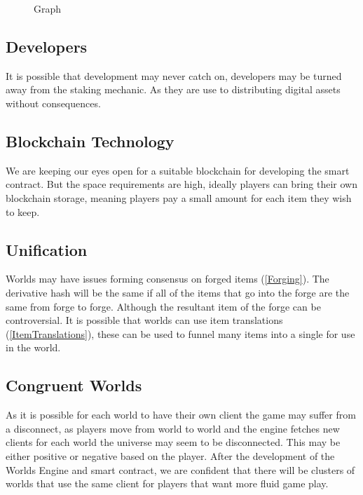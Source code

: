 \documentclass[runningheads,a4paper]{llncs}
\begin{document}
\begin{figure}
\centering
\caption{Graph}
\label{Graph}
\end{figure}

\subsection{Developers}
It is possible that development may never catch on, developers may be turned away from the staking mechanic. As they are use to distributing digital assets without consequences. 

\subsection{Blockchain Technology}
We are keeping our eyes open for a suitable blockchain for developing the smart contract. But the space requirements are high, ideally players can bring their own blockchain storage, meaning players pay a small amount for each item they wish to keep. 

\subsection{Unification}
Worlds may have issues forming consensus on forged items (\ref{Forging}). The derivative hash will be the same if all of the items that go into the forge are the same from forge to forge. Although the resultant item of the forge can be controversial. It is possible that worlds can use item translations (\ref{ItemTranslations}), these can be used to funnel many items into a single for use in the world.

\subsection{Congruent Worlds}
As it is possible for each world to have their own client the game may suffer from a disconnect, as players move from world to world and the engine fetches new clients for each world the universe may seem to be disconnected. This may be either positive or negative based on the player. After the development of the Worlds Engine and smart contract, we are confident that there will be clusters of worlds that use the same client for players that want more fluid game play.
\end{document}
